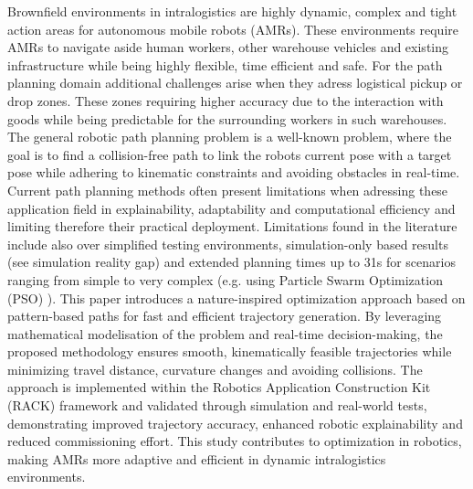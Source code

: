 \documentclass{amam}                %
\begin{document}
Brownfield environments in intralogistics are highly dynamic, complex and tight action areas for autonomous mobile robots (AMRs).
These environments require AMRs to navigate aside human workers, other warehouse vehicles and existing infrastructure while being highly 
flexible, time efficient and safe. For the path planning domain additional challenges arise when 
they adress logistical pickup or drop zones. These zones requiring higher accuracy due to the interaction with goods  while being
predictable for the surrounding workers in such warehouses. The general robotic path planning problem is a well-known problem,
where the goal is to find a collision-free path to link the robots current pose with a target pose while adhering to kinematic
constraints and avoiding obstacles in real-time. Current path planning methods often present limitations when adressing these application field in
explainability, adaptability and computational efficiency and limiting therefore their practical deployment. Limitations found in the literature
include also over simplified testing environments, simulation-only based results (see simulation reality gap) and extended planning times up to 31s
for scenarios ranging from simple to very complex (e.g. using Particle Swarm Optimization (PSO) \cite{ref1}). This paper introduces a 
nature-inspired optimization approach based on pattern-based paths for fast and efficient trajectory generation. By leveraging mathematical
modelisation of the problem and real-time decision-making, the proposed  methodology ensures smooth, kinematically feasible trajectories while
minimizing travel distance, curvature changes and avoiding collisions. The approach is implemented within the Robotics Application Construction Kit (RACK) 
framework and validated through simulation and real-world tests, demonstrating improved trajectory accuracy, enhanced robotic explainability and reduced commissioning effort.
This study contributes to optimization in robotics, making AMRs more adaptive and efficient in dynamic intralogistics environments.
\end{document}
